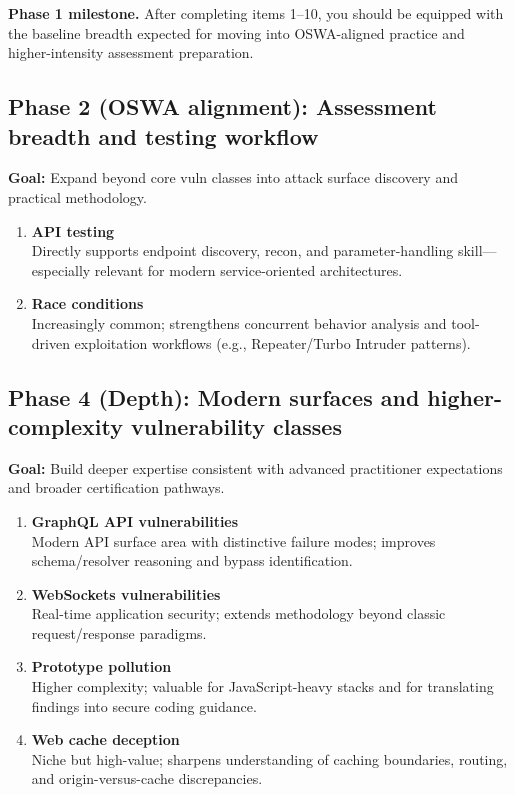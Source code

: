 \documentclass[11pt]{article}
\begin{document}
\begin{infobox}
\textbf{Phase 1 milestone.} After completing items 1--10, you should be equipped with the baseline breadth expected for moving into OSWA-aligned practice and higher-intensity assessment preparation.
\end{infobox}

\subsection{Phase 2 (OSWA alignment): Assessment breadth and testing workflow}
\textbf{Goal:} Expand beyond core vuln classes into attack surface discovery and practical methodology.

\begin{enumerate}[resume]
  \item \textbf{API testing}\\
  Directly supports endpoint discovery, recon, and parameter-handling skill---especially relevant for modern service-oriented architectures.
  \item \textbf{Race conditions}\\
  Increasingly common; strengthens concurrent behavior analysis and tool-driven exploitation workflows (e.g., Repeater/Turbo Intruder patterns).
\end{enumerate}

\subsection{Phase 4 (Depth): Modern surfaces and higher-complexity vulnerability classes}
\textbf{Goal:} Build deeper expertise consistent with advanced practitioner expectations and broader certification pathways.

\begin{enumerate}[resume]
  \item \textbf{GraphQL API vulnerabilities}\\
  Modern API surface area with distinctive failure modes; improves schema/resolver reasoning and bypass identification.
  \item \textbf{WebSockets vulnerabilities}\\
  Real-time application security; extends methodology beyond classic request/response paradigms.
  \item \textbf{Prototype pollution}\\
  Higher complexity; valuable for JavaScript-heavy stacks and for translating findings into secure coding guidance.
  \item \textbf{Web cache deception}\\
  Niche but high-value; sharpens understanding of caching boundaries, routing, and origin-versus-cache discrepancies.
\end{enumerate}
\end{document}
